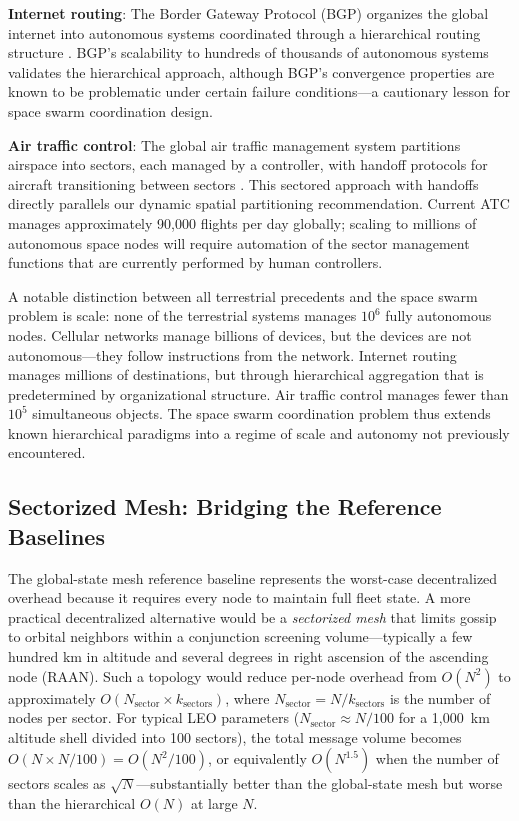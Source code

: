 \documentclass[journal]{IEEEtran}
\begin{document}
\textbf{Internet routing}: The Border Gateway Protocol (BGP) organizes the global internet into autonomous systems coordinated through a hierarchical routing structure \cite{rekhter_bgp}. BGP's scalability to hundreds of thousands of autonomous systems validates the hierarchical approach, although BGP's convergence properties are known to be problematic under certain failure conditions---a cautionary lesson for space swarm coordination design.

\textbf{Air traffic control}: The global air traffic management system partitions airspace into sectors, each managed by a controller, with handoff protocols for aircraft transitioning between sectors \cite{icao_atm}. This sectored approach with handoffs directly parallels our dynamic spatial partitioning recommendation. Current ATC manages approximately 90{,}000 flights per day globally; scaling to millions of autonomous space nodes will require automation of the sector management functions that are currently performed by human controllers.

A notable distinction between all terrestrial precedents and the space swarm problem is scale: none of the terrestrial systems manages $10^6$ fully autonomous nodes. Cellular networks manage billions of devices, but the devices are not autonomous---they follow instructions from the network. Internet routing manages millions of destinations, but through hierarchical aggregation that is predetermined by organizational structure. Air traffic control manages fewer than $10^5$ simultaneous objects. The space swarm coordination problem thus extends known hierarchical paradigms into a regime of scale and autonomy not previously encountered.

\subsection{Sectorized Mesh: Bridging the Reference Baselines}

The global-state mesh reference baseline represents the worst-case decentralized overhead because it requires every node to maintain full fleet state. A more practical decentralized alternative would be a \emph{sectorized mesh} that limits gossip to orbital neighbors within a conjunction screening volume---typically a few hundred km in altitude and several degrees in right ascension of the ascending node (RAAN). Such a topology would reduce per-node overhead from $O(N^2)$ to approximately $O(N_{\text{sector}} \times k_{\text{sectors}})$, where $N_{\text{sector}} = N / k_{\text{sectors}}$ is the number of nodes per sector. For typical LEO parameters ($N_{\text{sector}} \approx N/100$ for a 1{,}000~km altitude shell divided into 100 sectors), the total message volume becomes $O(N \times N/100) = O(N^2/100)$, or equivalently $O(N^{1.5})$ when the number of sectors scales as $\sqrt{N}$---substantially better than the global-state mesh but worse than the hierarchical $O(N)$ at large $N$.
\end{document}
